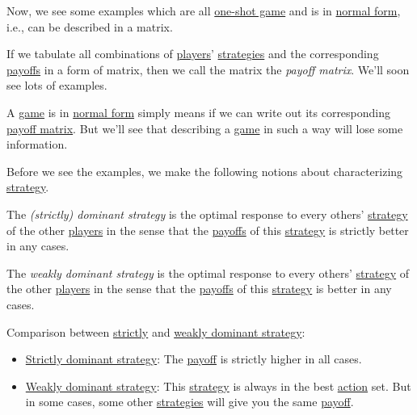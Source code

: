 Now, we see some examples which are all \hyperref[def:one-shot-game]{one-shot game} and is in \href{https://en.wikipedia.org/wiki/Normal-form_game}{normal form}, i.e.,
can be described in a matrix.

\begin{definition}\label{def:payoff-matrix}
	If we tabulate all combinations of \hyperref[def:player]{players}' \hyperref[def:strategy]{strategies} and the corresponding \hyperref[def:reward]{payoffs} in a
	form of matrix, then we call the matrix the \emph{payoff matrix}. We'll soon see lots of examples.
\end{definition}

\begin{remark}
	A \hyperref[def:game]{game} is in \href{https://en.wikipedia.org/wiki/Normal-form_game}{normal form} simply means if we can write out its corresponding
	\hyperref[def:payoff-matrix]{payoff matrix}. But we'll see that describing a \hyperref[def:game]{game} in such a way will lose some information.
\end{remark}

Before we see the examples, we make the following notions about characterizing \hyperref[def:strategy]{strategy}.
\begin{definition}\label{def:dominant-strategy}
	The \emph{(strictly) dominant strategy} is the optimal response to every others' \hyperref[def:strategy]{strategy} of the other \hyperref[def:player]{players}
	in the sense that the \hyperref[def:reward]{payoffs} of this \hyperref[def:strategy]{strategy} is strictly better in any cases.
\end{definition}
\begin{definition}\label{def:weakly-dominant-strategy}
	The \emph{weakly dominant strategy} is the optimal response to every others' \hyperref[def:strategy]{strategy} of the other \hyperref[def:player]{players}
	in the sense that the \hyperref[def:reward]{payoffs} of this \hyperref[def:strategy]{strategy} is better in any cases.
\end{definition}

\begin{remark}
	Comparison between \hyperref[def:dominant-strategy]{strictly} and \hyperref[def:weakly-dominant-strategy]{weakly dominant strategy}:
	\begin{itemize}
		\item \hyperref[def:dominant-strategy]{Strictly dominant strategy}: The \hyperref[def:reward]{payoff} is strictly higher in all cases.
		\item \hyperref[def:weakly-dominant-strategy]{Weakly dominant strategy}: This \hyperref[def:strategy]{strategy} is always in the best \hyperref[def:strategy]{action} set.
		      But in some cases, some other \hyperref[def:strategy]{strategies} will give you the same \hyperref[def:reward]{payoff}.
	\end{itemize}
\end{remark}

